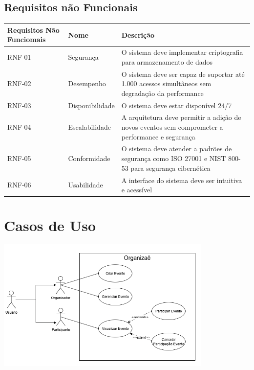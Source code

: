 \documentclass[12pt,a4paper]{article}
\begin{document}

\subsection{Requisitos não Funcionais}

\begin{tabular}{ | m{6em} | m{5cm}| m{20em} |}
  \hline
  Requisitos Não Funciomais & Nome & Descrição \\
  \hline
  RNF-01 & Segurança & O sistema deve implementar criptografia para armazenamento de dados \\ 
  \hline
  RNF-02 & Desempenho & O sistema deve ser capaz de suportar até 1.000 acessos simultâneos sem degradação da performance\\ 
  \hline
  RNF-03 & Disponibilidade & O sistema deve estar disponível 24/7 \\ 
  \hline
  RNF-04 & Escalabilidade & A arquitetura deve permitir a adição de novos eventos sem comprometer a performance e segurança \\ 
  \hline
  RNF-05 & Conformidade & O sistema deve atender a padrões de segurança como ISO 27001 e NIST 800-53 para segurança cibernética \\ 
  \hline
  RNF-06 & Usabilidade & A interface do sistema deve ser intuitiva e acessível \\ 
  \hline
\end{tabular}


\section{Casos de Uso}

\begin{center}
  \includegraphics[width=0.8\textwidth]{D_Organizae_drawio.png}
\end{center}
\end{document}
